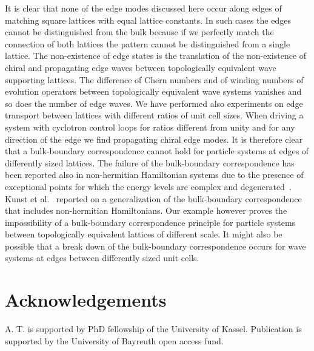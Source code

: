 \documentclass[12pt]{iopart}
\begin{document}
It is clear that none of the edge modes discussed here occur along edges of matching square lattices with equal lattice constants.
In such cases the edges cannot be distinguished from the bulk because if we perfectly match the connection of both lattices the pattern
cannot be distinguished from a single lattice. 
The non-existence of edge states is the translation of the non-existence of chiral and propagating edge waves between topologically
equivalent wave supporting lattices. The difference of Chern numbers and of winding numbers of evolution operators
between topologically equivalent wave systems vanishes and so does the number of edge waves. We have performed also experiments on
edge transport between lattices with different ratios of unit cell sizes. When driving a system with cyclotron control loops for
ratios different from unity and for any direction of the edge we find propagating chiral edge modes.
It is therefore clear that a bulk-boundary correspondence cannot hold for particle systems at edges of differently sized lattices.
The failure of the bulk-boundary correspondence has been reported also in non-hermitian Hamiltonian systems
due to the presence of exceptional points for which the energy levels are complex and degenerated~\cite{Xiong}.
Kunst et al.~\cite{Kunst} reported on a generalization of the bulk-boundary correspondence that includes non-hermitian Hamiltonians.
Our example however proves the impossibility of a bulk-boundary correspondence principle for particle systems between topologically
equivalent lattices of different scale. 
It might also be possible that a break down of the bulk-boundary correspondence occurs for wave systems at edges between differently sized unit cells. 




\section*{Acknowledgements}
A. T. is supported by PhD fellowship of the University of Kassel. Publication is supported by the University of Bayreuth open access fund. 
\end{document}
